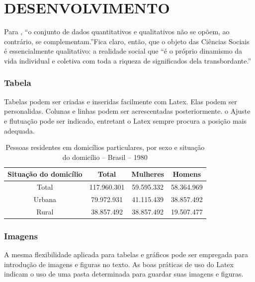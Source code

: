 \chapter{DESENVOLVIMENTO}

Para , “o conjunto de dados quantitativos e qualitativos não se opõem, ao contrário, se complementam.”Fica claro, então, que o objeto das Ciências Sociais é essencialmente qualitativo: a realidade social que “é o próprio dinamismo da vida individual e coletiva com toda a riqueza de significados dela transbordante.” \cite{minayo1994pesquisa}


\subsection{Tabela}

Tabelas podem ser criadas e inseridas facilmente com Latex. Elas podem ser personalidas. Colunas e linhas podem ser acrescentadas posteriormente. o Ajuste e flutuação pode ser indicado, entretant o Latex sempre procura a posição mais adequada.

\begin{table}[htb]
    \centering
    \caption{Pessoas residentes em domicílios particulares, por sexo e situação do domicílio – Brasil – 1980}
    \begin{tabular}{c c c c}
    \hline
        Situação do domicílio   & Total  &  Mulheres   &  Homens   \\
    \hline
        Total                   & 117.960.301 &  59.595.332 &  58.364.969 \\
        Urbana                  & 79.972.931  &  41.115.439 &  38.857.492 \\  
        Rural                   & 38.857.492  &  38.857.492 &  19.507.477 \\
    \hline
    \end{tabular}
\end{table}


\subsection{Imagens}

A mesma flexibilidade aplicada para tabelas e gráficos pode ser empregada para introdução de imagens e figuras no texto. As boas práticas de uso do Latex indicam o uso de uma pasta determinada para guardar suas imagens e figuras.

